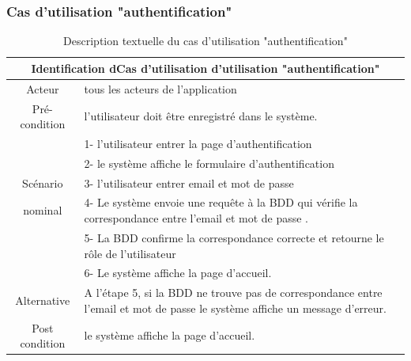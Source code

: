 \documentclass[edit,12pt,a4paper,ChapStyle,oneside,doubleinterligne]{report}
\begin{document}
\subsubsection{Cas d'utilisation "authentification"}
\begin{table}[h!]
    \centering
    \begin{tabular}{|c|m{10cm}|}
    \hline
         \multicolumn{2}{|c|}{Identification dCas d'utilisation d'utilisation "authentification" }\\
         \hline
         Acteur & tous les acteurs de l’application\\
         \hline
         Pré-condition &  l’utilisateur doit être enregistré dans le système.\\
         \hline
          & 1- l'utilisateur entrer la page d'authentification\\
          & 2- le système affiche le formulaire d'authentification \\
          Scénario& 3- l'utilisateur entrer email et mot de passe \\
          nominal & 4- Le système envoie une requête à la BDD qui vérifie la correspondance entre l’email et mot de passe . \\
          & 5- La BDD confirme la correspondance correcte et retourne le rôle de l’utilisateur \\
          & 6- Le système affiche la page d’accueil.\\
         \hline
         Alternative  & A l’étape 5, si la BDD ne trouve pas de correspondance entre l’email et mot de passe le système affiche un message d’erreur.\\
         \hline
         Post condition & le système affiche la page d’accueil. \\
         \hline
    \end{tabular}
    \caption{Description textuelle du cas d'utilisation "authentification" }
    \label{tab:cas2}
\end{table}
\end{document}
